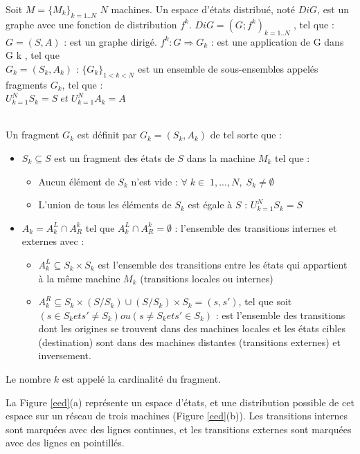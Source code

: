 \begin{definition}
Soit $M =\{M_k\}_{k=1..N}$ $N$ machines. Un espace d'états distribué, noté $DiG$, est un graphe avec une fonction de distribution $f^k$. $DiG = (G; f^k )_{ k=1..N}$ , tel que : $G = (S, A)$ : est un graphe dirigé.
$f^k : G \Rightarrow G_k$ : est une application de G dans G k , tel que \\$G_k = (S_k , A_k )$ : $\{G_k \}_{1<k<N}$ est un ensemble de sous-ensembles appelés fragments $G_k $, tel que :\\ $U^{N}_{k=1} S_k = S\; et\; U^{N}_{k=1}A_k = A$
\end{definition}

\begin{definition} \citep{BENSETIRA2017}\\
Un fragment $G_k$ est définit par $G_k = (S_k , A_k )$ de tel sorte que :
\begin{itemize}
\item $S_k\subseteq S$ est un fragment des états de $S$ dans la machine $M_k$ tel que :
	\begin{itemize}
	\item  Aucun élément de $S_k$ n'est vide : $\forall \;k \in \;1, ..., N,\; S_k \ne \emptyset$
	\item L'union de tous les éléments de $S_k$ est égale à $S$ : $U^{N}_ {k=1} S_k = S$
	\end{itemize}
\item $A_k = A^{L}_{k}\cap A^{k}_{R}$ tel que  $A^{L}_{k} \cap A^{k}_{R}= \emptyset$ : l'ensemble des transitions internes et externes avec :
	\begin{itemize}
	\item  $A^{L}_{k}\subseteq S_k \times S_k$ est l'ensemble des transitions entre les états qui appartient à la même machine $M_k$ (transitions locales ou internes)
	\item  $A^{R}_{k}\subseteq S_k \times (S/S_k ) \cup (S/S_k ) \times S_k = (s, s')$, tel que soit $(s \in S_k et s' \neq S_k ) ou(s \neq S_k et s'
\in S_k )$ : est l'ensemble des transitions dont les origines se trouvent dans des machines locales et les états cibles (destination) sont dans des machines distantes (transitions externes) et inversement.
	\end{itemize}
	
\end{itemize}
Le nombre $k$ est appelé la cardinalité du fragment.
\end{definition}

La Figure \ref{eed}(a) représente un espace d'états, et une distribution possible de cet espace sur un réseau de trois machines (Figure \ref{eed}(b)). Les transitions internes sont marquées avec des lignes continues, et les transitions externes sont marquées avec des lignes en pointillés.

